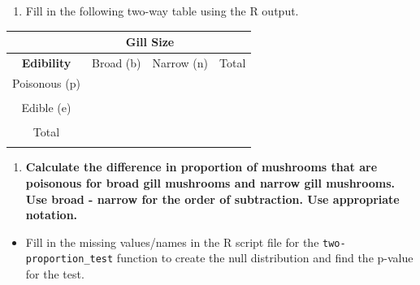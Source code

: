 \documentclass[
]{report}
\providecommand{\tightlist}{%
  \setlength{\itemsep}{0pt}\setlength{\parskip}{0pt}}
\begin{document}
\vspace{1in}

\begin{enumerate}
\def\labelenumi{\arabic{enumi}.}
\setcounter{enumi}{5}
\tightlist
\item
  Fill in the following two-way table using the R output.
\end{enumerate}

\begin{center}
\begin{tabular}{|c|c|c|c|}\hline
& \multicolumn{2}{|c|}{\textbf{Gill Size}} & \\ \hline
\textbf{Edibility} & \hspace{0.35in} Broad (b) \hspace{0.35in} & \hspace{0.35in} Narrow (n) \hspace{0.35in} & \hspace{0.35in} Total \hspace{0.35in} \\ \hline
 Poisonous (p) & & & \\ 
 & & & \\ \hline
Edible (e) & & & \\ 
 & & & \\ \hline
 Total & & & \\ 
 & & & \\ \hline
\end{tabular}
\end{center}

\begin{enumerate}
\def\labelenumi{\arabic{enumi}.}
\setcounter{enumi}{6}
\tightlist
\item
  \textbf{Calculate the difference in proportion of mushrooms that are poisonous for broad gill mushrooms and narrow gill mushrooms. Use broad - narrow for the order of subtraction. Use appropriate notation.}
\end{enumerate}

\vspace{0.8in}

\begin{itemize}
\tightlist
\item
  Fill in the missing values/names in the R script file for the \texttt{two-proportion\_test} function to create the null distribution and find the p-value for the test.
\end{itemize}
\end{document}
